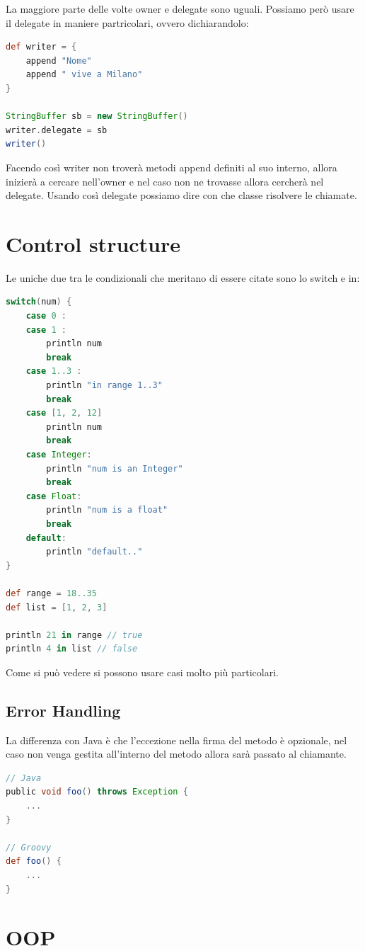 \documentclass[11pt,a4paper]{book}
\begin{document}
La maggiore parte delle volte owner e delegate sono uguali. Possiamo però usare il delegate in maniere partricolari, ovvero dichiarandolo:
\begin{lstlisting}[language = groovy]
def writer = {
    append "Nome"
    append " vive a Milano"
}

StringBuffer sb = new StringBuffer()
writer.delegate = sb
writer()
\end{lstlisting}

Facendo così writer non troverà metodi append definiti al suo interno, allora inizierà a cercare nell'owner e nel caso non ne trovasse allora cercherà nel delegate. Usando così delegate possiamo dire con che classe risolvere le chiamate.

\chapter{Control structure}
Le uniche due tra le condizionali che meritano di essere citate sono lo switch e in:
\begin{lstlisting}[language = groovy]
switch(num) {
    case 0 :
    case 1 :
        println num
        break
    case 1..3 :
        println "in range 1..3"
        break
    case [1, 2, 12]
        println num
        break
    case Integer:
        println "num is an Integer"
        break
    case Float:
        println "num is a float"
        break
    default:
        println "default.."
}       

def range = 18..35
def list = [1, 2, 3]

println 21 in range // true
println 4 in list // false
\end{lstlisting}

Come si può vedere si possono usare casi molto più particolari.

\section{Error Handling}
La differenza con Java è che l'eccezione nella firma del metodo è opzionale, nel caso non venga gestita all'interno del metodo allora sarà passato al chiamante.

\begin{lstlisting}[language = groovy]
// Java
public void foo() throws Exception {
	...
}

// Groovy
def foo() {
	...
}
\end{lstlisting}

\chapter{OOP}
\end{document}
